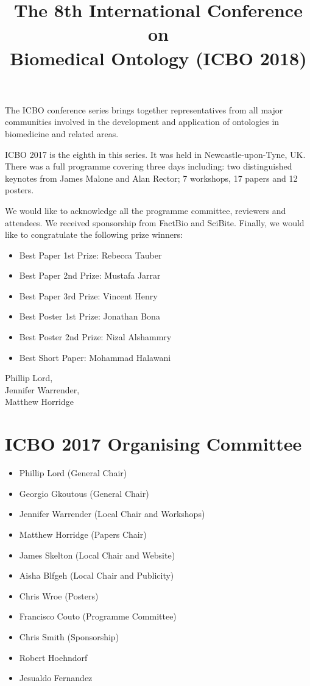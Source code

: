 \documentclass{article}
\title{The 8th International Conference on\\Biomedical Ontology (ICBO 2018)}
\date{}
\begin{document}
\parindent0pt
\parskip15pt
\maketitle

The ICBO conference series brings together representatives from all
major communities involved in the development and application of
ontologies in biomedicine and related areas.

ICBO 2017 is the eighth in this series. It was held in
Newcastle-upon-Tyne, UK. There was a full programme covering three
days including: two distinguished keynotes from James Malone and Alan
Rector; 7 workshops, 17 papers and 12 posters.

We would like to acknowledge all the programme committee, reviewers and
attendees. We received sponsorship from FactBio and SciBite. Finally, we would like to congratulate the following prize winners:

\begin{itemize}
\item Best Paper 1st Prize: Rebecca Tauber
\item Best Paper 2nd Prize: Mustafa Jarrar
\item Best Paper 3rd Prize: Vincent Henry
\item Best Poster 1st Prize: Jonathan Bona
\item Best Poster 2nd Prize: Nizal Alshammry
\item Best Short Paper: Mohammad Halawani
\end{itemize}

Phillip Lord,\\
Jennifer Warrender,\\
Matthew Horridge

\section*{ICBO 2017 Organising Committee}

\begin{itemize}
\item Phillip Lord (General Chair)
\item Georgio Gkoutous (General Chair)
\item Jennifer Warrender (Local Chair and Workshops)
\item Matthew Horridge (Papers Chair)
\item James Skelton (Local Chair and Website)
\item Aisha Blfgeh (Local Chair and Publicity)
\item Chris Wroe (Posters)
\item Francisco Couto (Programme Committee)
\item Chris Smith (Sponsorship) 
\item Robert Hoehndorf
\item Jesualdo Fernandez
\end{itemize}
\newpage
\end{document}

